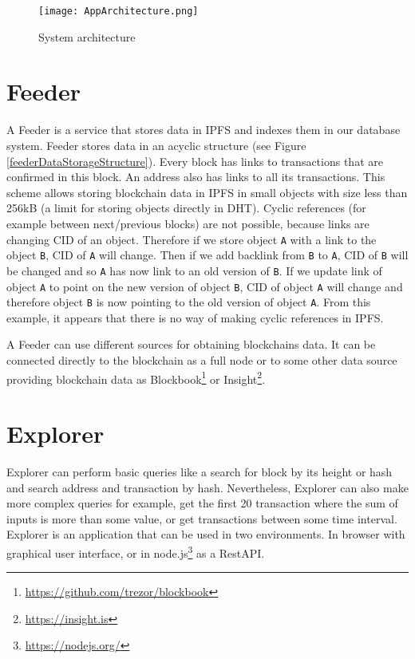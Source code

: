 \begin{figure}[h]
    \centering
    \texttt{[image: AppArchitecture.png]}
    \caption{System architecture}
    \label{systemArchitecture}
\end{figure}


\section{Feeder}
A Feeder is a service that stores data in IPFS and indexes them in our database system. Feeder stores data in an acyclic structure (see Figure \ref{feederDataStorageStructure}). Every block has links to transactions that are confirmed in this block. An address also has links to all its transactions. This scheme allows storing blockchain data in IPFS in small objects with size less than 256kB (a limit for storing objects directly in DHT). Cyclic references (for example between next/previous blocks) are not possible, because links are changing CID of an object. Therefore if we store object \texttt{A} with a link to the object \texttt{B}, CID of \texttt{A} will change. Then if we add backlink from \texttt{B} to \texttt{A}, CID of \texttt{B} will be changed and so \texttt{A} has now link to an old version of \texttt{B}. If we update link of object \texttt{A} to point on the new version of object \texttt{B}, CID of object \texttt{A} will change and therefore object \texttt{B} is now pointing to the old version of object \texttt{A}. From this example, it appears that there is no way of making cyclic references in IPFS.

A Feeder can use different sources for obtaining blockchains data. It can be connected directly to the blockchain as a full node or to some other data source providing blockchain data as Blockbook\footnote{\url{https://github.com/trezor/blockbook}} or Insight\footnote{\url{https://insight.is}}.







\section{Explorer}
Explorer can perform basic queries like a search for block by its height or hash and search address and transaction by hash. Nevertheless, Explorer can also make more complex queries for example, get the first 20 transaction where the sum of inputs is more than some value, or get transactions between some time interval. Explorer is an application that can be used in two environments. In browser with graphical user interface, or in node.js\footnote{\url{https://nodejs.org/}} as a RestAPI.

